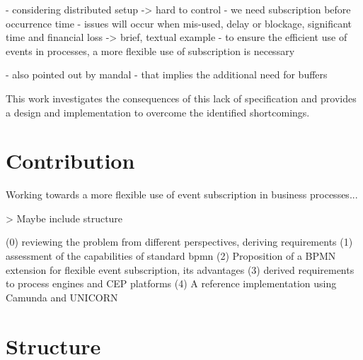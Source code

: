 - considering distributed setup -> hard to control
- we need subscription before occurrence time
- issues will occur when mis-used, delay or blockage, significant time and financial loss
-> brief, textual example
- to ensure the efficient use of events in processes, a more flexible use of subscription is necessary

- also pointed out by mandal
- that implies the additional need for buffers


This work investigates the consequences of this lack of specification and provides a design and implementation to overcome the identified shortcomings.



\section{Contribution}
Working towards a more flexible use of event subscription in business processes...

> Maybe include structure

(0) reviewing the problem from different perspectives, deriving requirements
(1) assessment of the capabilities of standard bpmn
(2) Proposition of a BPMN extension for flexible event subscription, its advantages
(3) derived requirements to process engines and CEP platforms
(4) A reference implementation using Camunda and UNICORN


\section{Structure}
